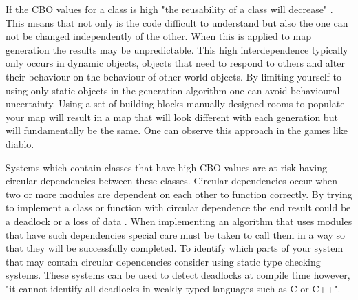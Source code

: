 \documentclass{scrartcl}
\begin{document}
If the CBO values for a class is high "the reusability of a class will decrease" \cite[p. 468]{rathore2011novel}. This means that not only is the code difficult to understand but also the one can not be changed independently of the other. When this is applied to map generation the results may be unpredictable. This high interdependence typically only occurs in dynamic objects, objects that need to respond to others and alter their behaviour on the behaviour of other world objects. By limiting yourself to using only static objects in the generation algorithm one can avoid behavioural uncertainty. Using a set of building blocks manually designed rooms to populate your map will result in a map that will look different with each generation but will fundamentally be the same. One can observe this approach in the games like diablo\cite {togelius2013procedural}. 

Systems which contain classes that have high CBO values are at risk having circular dependencies between these classes. Circular dependencies occur when two or more modules are dependent on each other to function correctly\cite{nair2016solving}. By trying to implement a class or function with circular dependence the end result could be a deadlock or a loss of data \cite {nair2016solving}. When implementing an algorithm that uses modules that have such dependencies special care must be taken to call them in a way so that they will be successfully completed. To identify which parts of your system that may contain circular dependencies consider using static type checking systems\cite{boyapati2002ownership, naik2009effective}. These systems can be used to detect deadlocks at compile time however, "it cannot identify all deadlocks in weakly typed languages such as C or C++"\cite[p.76]{pyla2010avoiding}.
\end{document}
